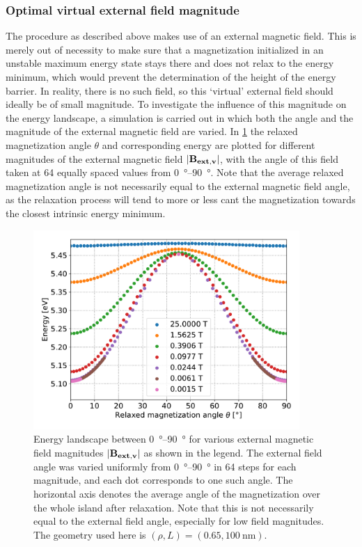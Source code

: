 \documentclass[12pt,a4paper]{article}
\begin{document}
\subsubsection{Optimal virtual external field magnitude}
The procedure as described above makes use of an external magnetic field. This is merely out of necessity to make sure that a magnetization initialized in an unstable maximum energy state stays there and does not relax to the energy minimum, which would prevent the determination of the height of the energy barrier. In reality, there is no such field, so this `virtual' external field should ideally be of small magnitude. To investigate the influence of this magnitude on the energy landscape, a simulation is carried out in which both the angle and the magnitude of the external magnetic field are varied. In \cref{fig:barrierLandscape-sweepBext} the relaxed magnetization angle $\theta$ and corresponding energy are plotted for different magnitudes of the external magnetic field $\abs{\vb{B_{ext,v}}}$, with the angle of this field taken at 64 equally spaced values from \SIrange{0}{90}{\degree}. Note that the average relaxed magnetization angle is not necessarily equal to the external magnetic field angle, as the relaxation process will tend to more or less cant the magnetization towards the closest intrinsic energy minimum.
\begin{figure}
    \centering
    \includegraphics[width=0.9\textwidth]{Figures/biaxial_island/BarrierLandscape/Plus_65_B25-0.001-div4_a128Pi_plotOptimized.pdf}
    \caption{Energy landscape between \SIrange{0}{90}{\degree} for various external magnetic field magnitudes $\abs{\vb{B_{ext,v}}}$ as shown in the legend. The external field angle was varied uniformly from \SIrange{0}{90}{\degree} in 64 steps for each magnitude, and each dot corresponds to one such angle. The horizontal axis denotes the average angle of the magnetization over the whole island after relaxation. Note that this is not necessarily equal to the external field angle, especially for low field magnitudes. The geometry used here is $(\rho, L)=(0.65, \SI{100}{\nano\metre})$.}
    \label{fig:barrierLandscape-sweepBext}
\end{figure}
\end{document}
